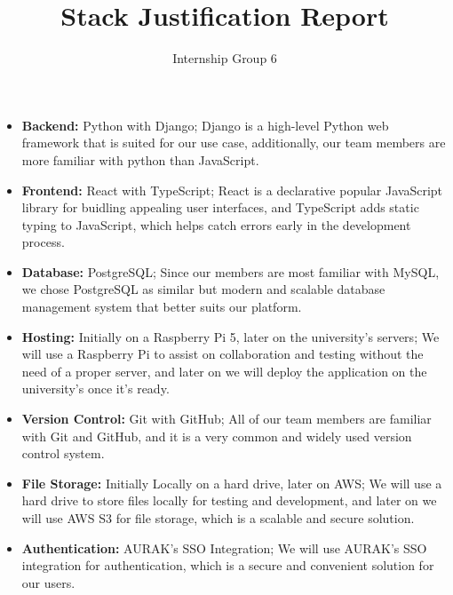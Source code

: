 \documentclass{article}
\title{Stack Justification Report}
\author{Internship Group 6}
\begin{document}
\maketitle
\noindent

\begin{itemize}
    \item \textbf{Backend:} Python with Django; Django is a high-level Python web framework that is suited for our use case, additionally, our team members are more familiar with python than JavaScript.
    \item \textbf{Frontend:} React with TypeScript; React is a declarative popular JavaScript library for buidling appealing user interfaces, and TypeScript adds static typing to JavaScript, which helps catch errors early in the development process.
    \item \textbf{Database:} PostgreSQL; Since our members are most familiar with MySQL, we chose PostgreSQL as similar but modern and scalable database management system that better suits our platform.
    \item \textbf{Hosting:} Initially on a Raspberry Pi 5, later on the university's servers; We will use a Raspberry Pi to assist on collaboration and testing without the need of a proper server, and later on we will deploy the application on the university's once it's ready.
    \item \textbf{Version Control:} Git with GitHub; All of our team members are familiar with Git and GitHub, and it is a very common and widely used version control system.
    \item \textbf{File Storage:} Initially Locally on a hard drive, later on AWS; We will use a hard drive to store files locally for testing and development, and later on we will use AWS S3 for file storage, which is a scalable and secure solution.
    \item \textbf{Authentication:} AURAK's SSO Integration; We will use AURAK's SSO integration for authentication, which is a secure and convenient solution for our users.
\end{itemize}
\end{document}
